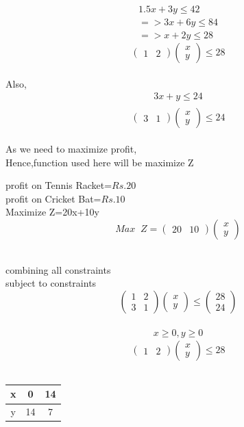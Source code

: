 \documentclass[10pt, a4paper]{article}
\newcommand{\myvec}[1]{\ensuremath{\begin{pmatrix}#1\end{pmatrix}}}
\begin{document}
\begin{align}
 1.5x+3y \le 42 \\
=>3x+6y \le 84 \\
=>x+2y \le28
\end{align}
\begin{equation}
\myvec{1&2}\myvec{x\\y}\le 28
\end{equation}\\
Also,\\
\begin{align}
 3x+y \le 24 \\
\end{align}
\begin{equation}
\myvec{3&1}\myvec{x\\y}\le 24
\end{equation}\\
As we need to maximize profit,\\
Hence,function used here will be maximize Z\\
\begin{center}
profit on Tennis Racket=$Rs.20$\\
profit on Cricket Bat=$Rs.10$\\
Maximize Z=20x+10y\\
\begin{equation}
Max \;\;Z=\myvec{20&10}\myvec{x\\y}
\end{equation}\\
\end{center}
combining all constraints\\
subject to constraints\\
\begin{equation}
\myvec{1&2\\3&1}\myvec{x\\y}\le \myvec{28\\24}
\end{equation}\\
\begin{align}
  x \ge 0, y \ge 0
\end{align}
\begin{equation}
\myvec{1&2}\myvec{x\\y}\le 28
\end{equation}\\
\begin{center}
\begin{tabular}{|c|c|c|}
	\hline
	x&0&14\\
	\hline
	y&14&7\\
	\hline
\end{tabular}\\
\end{center}
\end{document}
